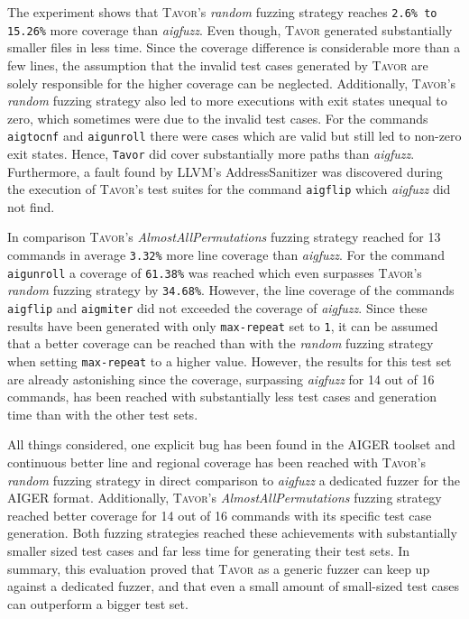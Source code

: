 The experiment shows that \textsc{Tavor}'s \emph{random} fuzzing strategy reaches \texttt{2.6\% to 15.26\%} more coverage than \emph{aigfuzz}. Even though, \textsc{Tavor} generated substantially smaller files in less time. Since the coverage difference is considerable more than a few lines, the assumption that the invalid test cases generated by \textsc{Tavor} are solely responsible for the higher coverage can be neglected. Additionally, \textsc{Tavor}'s \emph{random} fuzzing strategy also led to more executions with exit states unequal to zero, which sometimes were due to the invalid test cases. For the commands \texttt{aigtocnf} and \texttt{aigunroll} there were cases which are valid but still led to non-zero exit states. Hence, \texttt{Tavor} did cover substantially more paths than \emph{aigfuzz}. Furthermore, a fault found by LLVM's AddressSanitizer was discovered during the execution of \textsc{Tavor}'s test suites for the command \texttt{aigflip} which \emph{aigfuzz} did not find.

In comparison \textsc{Tavor}'s \emph{AlmostAllPermutations} fuzzing strategy reached for 13 commands in average \texttt{3.32\%} more line coverage than \emph{aigfuzz}. For the command \texttt{aigunroll} a coverage of \texttt{61.38\%} was reached which even surpasses \textsc{Tavor}'s \emph{random} fuzzing strategy by \texttt{34.68\%}. However, the line coverage of the commands \texttt{aigflip} and \texttt{aigmiter} did not exceeded the coverage of \emph{aigfuzz}. Since these results have been generated with only \texttt{max-repeat} set to \texttt{1}, it can be assumed that a better coverage can be reached than with the \emph{random} fuzzing strategy when setting \texttt{max-repeat} to a higher value. However, the results for this test set are already astonishing since the coverage, surpassing \emph{aigfuzz} for 14 out of 16 commands, has been reached with substantially less test cases and generation time than with the other test sets.

All things considered, one explicit bug has been found in the AIGER toolset and continuous better line and regional coverage has been reached with \textsc{Tavor}'s \emph{random} fuzzing strategy in direct comparison to \emph{aigfuzz} a dedicated fuzzer for the AIGER format. Additionally, \textsc{Tavor}'s \emph{AlmostAllPermutations} fuzzing strategy reached better coverage for 14 out of 16 commands with its specific test case generation. Both fuzzing strategies reached these achievements with substantially smaller sized test cases and far less time for generating their test sets. In summary, this evaluation proved that \textsc{Tavor} as a generic fuzzer can keep up against a dedicated fuzzer, and that even a small amount of small-sized test cases can outperform a bigger test set.

